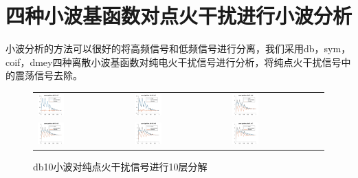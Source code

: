 \section{四种小波基函数对点火干扰进行小波分析}
小波分析的方法可以很好的将高频信号和低频信号进行分离，我们采用db，sym，coif，dmey四种离散小波基函数对纯电火干扰信号进行分析，将纯点火干扰信号中的震荡信号去除。
\begin{figure}[!htb]
	\begin{tabular}{lll}
		\includegraphics[width=0.3\textwidth]{thesis_figure/ion_chapter/db10_lvl2}&
		\includegraphics[width=0.3\textwidth]{thesis_figure/ion_chapter/db10_lvl3}&
		\includegraphics[width=0.3\textwidth]{thesis_figure/ion_chapter/db10_lvl4}\\
		\includegraphics[width=0.3\textwidth]{thesis_figure/ion_chapter/db10_lvl5}&
		\includegraphics[width=0.3\textwidth]{thesis_figure/ion_chapter/db10_lvl6}&
		\includegraphics[width=0.3\textwidth]{thesis_figure/ion_chapter/db10_lvl7}
	\end{tabular}
	\caption{\label{fig:db10}db10小波对纯点火干扰信号进行10层分解}
\end{figure}
